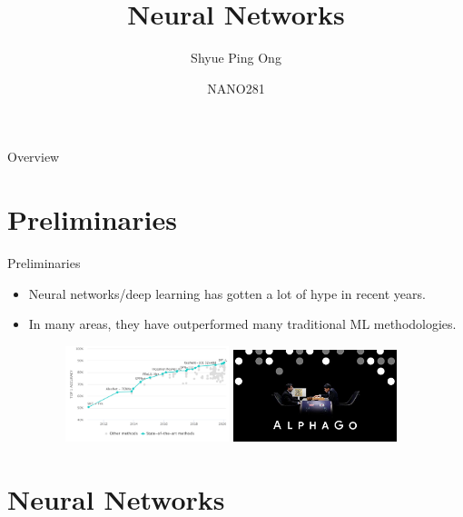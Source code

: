 \documentclass{beamer}
\title[Neural Networks]{Neural Networks}
\author{Shyue Ping Ong}
\institute[UCSD]{University of California, San Diego\\
\medskip
}
\date{NANO281} %
\begin{document}
\begin{frame}
    \titlepage %
\end{frame}


\begin{frame}{Overview}
    \tableofcontents
\end{frame}


\section{Preliminaries}

\begin{frame}{Preliminaries}
    \begin{itemize}
        \item Neural networks/deep learning has gotten a lot of hype in recent years.
        \item In many areas, they have outperformed many traditional ML methodologies.
    \begin{figure}
        \centering
        \includegraphics[width=0.45\textwidth]{figures/imagenet.pdf}
        \includegraphics[width=0.45\textwidth]{figures/alphago.jpg}
    \end{figure}
    \end{itemize}

\end{frame}

\section{Neural Networks}
\end{document}
